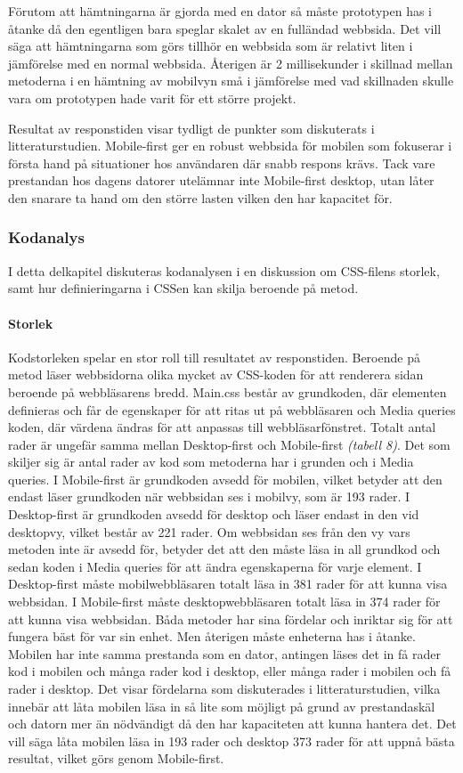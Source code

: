 \documentclass[11pt]{article}
\begin{document}
Förutom att hämtningarna är gjorda med en dator så måste prototypen has i åtanke då den egentligen bara speglar skalet av en fulländad webbsida. Det vill säga att hämtningarna som görs tillhör en webbsida som är relativt liten i jämförelse med en normal webbsida. Återigen är 2 millisekunder i skillnad mellan metoderna i en hämtning av mobilvyn små i jämförelse med vad skillnaden skulle vara om prototypen hade varit för ett större projekt.

Resultat av responstiden visar tydligt de punkter som diskuterats i litteraturstudien. Mobile-first ger en robust webbsida för mobilen som fokuserar i första hand på situationer hos användaren där snabb respons krävs. Tack vare prestandan hos dagens datorer utelämnar inte Mobile-first desktop, utan låter den snarare ta hand om den större lasten vilken den har kapacitet för.

\subsubsection{Kodanalys}
I detta delkapitel diskuteras kodanalysen i en diskussion om CSS-filens storlek, samt hur definieringarna i CSSen kan skilja beroende på metod.
\paragraph{Storlek}\mbox{}

Kodstorleken spelar en stor roll till resultatet av responstiden. Beroende på metod läser webbsidorna olika mycket av CSS-koden för att renderera sidan beroende på webbläsarens bredd. Main.css består av grundkoden, där elementen definieras och får de egenskaper för att ritas ut på webbläsaren och Media queries koden, där värdena ändras för att anpassas till webbläsarfönstret. Totalt antal rader är ungefär samma mellan Desktop-first och Mobile-first \textit{(tabell 8)}. Det som skiljer sig är antal rader av kod som metoderna har i grunden och i Media queries. I Mobile-first är grundkoden avsedd för mobilen, vilket betyder att den endast läser grundkoden när webbsidan ses i mobilvy, som är 193 rader. I Desktop-first är grundkoden avsedd för desktop och läser endast in den vid desktopvy, vilket består av 221 rader. Om webbsidan ses från den vy vars metoden inte är avsedd för, betyder det att den måste läsa in all grundkod och sedan koden i Media queries för att ändra egenskaperna för varje element. I Desktop-first måste mobilwebbläsaren totalt läsa in 381 rader för att kunna visa webbsidan. I Mobile-first måste desktopwebbläsaren totalt läsa in 374 rader för att kunna visa webbsidan. Båda metoder har sina fördelar och inriktar sig för att fungera bäst för var sin enhet. Men återigen måste enheterna has i åtanke. Mobilen har inte samma prestanda som en dator, antingen läses det in få rader kod i mobilen och många rader kod i desktop, eller många rader i mobilen och få rader i desktop. Det visar fördelarna som diskuterades i litteraturstudien, vilka innebär att låta mobilen läsa in så lite som möjligt på grund av prestandaskäl och datorn mer än nödvändigt då den har kapaciteten att kunna hantera det. Det vill säga låta mobilen läsa in 193 rader och desktop 373 rader för att uppnå bästa resultat, vilket görs genom Mobile-first.
\end{document}
